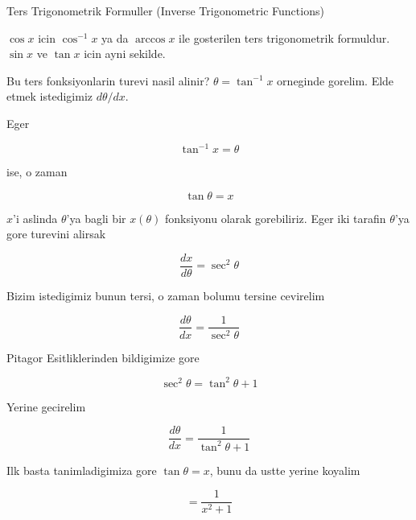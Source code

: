 \documentclass[12pt,fleqn]{article}\usepackage{../common}
\begin{document}
Ters Trigonometrik Formuller (Inverse Trigonometric Functions)

$\cos x$ icin $\cos^{-1} x$ ya da $\arccos x$ ile gosterilen ters
trigonometrik formuldur. $\sin x$ ve $\tan x$ icin ayni sekilde. 

Bu ters fonksiyonlarin turevi nasil alinir? $\theta = \tan^{-1}x$ orneginde
gorelim. Elde etmek istedigimiz $d\theta/dx$. 

Eger

\[ \tan^{-1}x = \theta\]

ise, o zaman 

\[ \tan\theta = x \]

$x$'i aslinda $\theta$'ya bagli bir $x(\theta)$ fonksiyonu olarak gorebiliriz. 
Eger iki tarafin $\theta$'ya gore turevini alirsak

\[ \frac{dx}{d\theta} = \sec^{2}\theta \]

Bizim istedigimiz bunun tersi, o zaman bolumu tersine cevirelim

\[ \frac{d\theta}{dx} = \frac{1}{\sec^{2}\theta} \]

Pitagor Esitliklerinden bildigimize gore

\[ \sec^{2}\theta = \tan^{2}\theta + 1 \]

Yerine gecirelim

\[ \frac{d\theta}{dx} = \frac{1}{\tan^{2}\theta + 1} \]

Ilk basta tanimladigimiza gore $\tan\theta = x$, bunu da ustte yerine
koyalim

\[  = \frac{1}{x^2 + 1} \]
\end{document}
